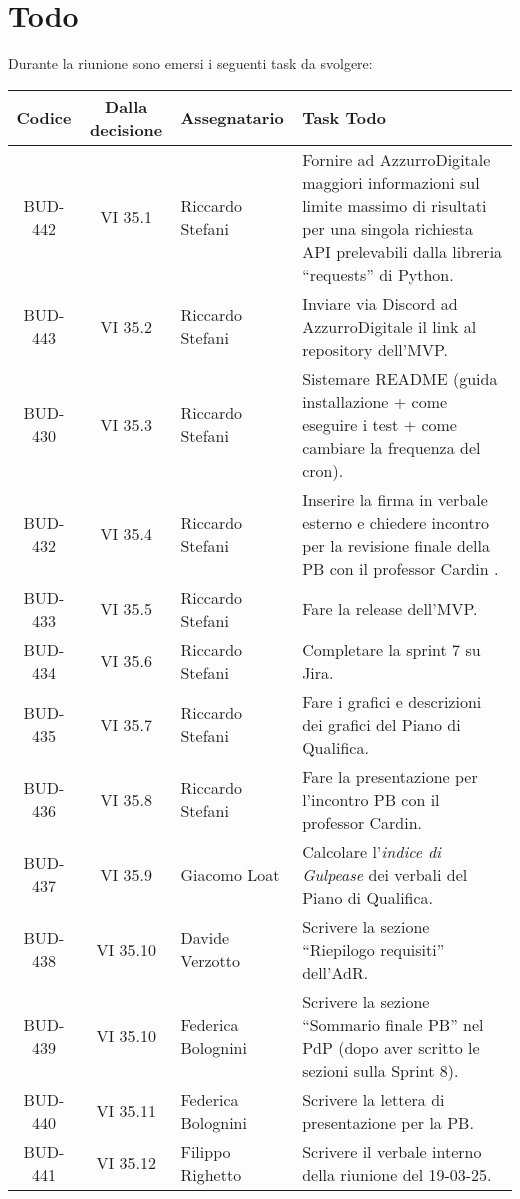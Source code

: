 
\section{Todo}

Durante la riunione sono emersi i seguenti task da svolgere:

\vspace{0.5cm}

\begin{table}[htbp]
\centering
{}
\begin{tabular}{|c|c|p{}|p{}|}
    \hline
    \rowcolor[gray]{0.75}
    \textbf{Codice} & \textbf{Dalla decisione} & \textbf{Assegnatario} & \textbf{Task Todo} \\
    \hline
    BUD-442 & VI 35.1 & Riccardo Stefani & Fornire ad AzzurroDigitale maggiori informazioni sul limite massimo di risultati per una singola richiesta API prelevabili dalla libreria “requests” di Python.\\
    \hline
    BUD-443 & VI 35.2 & Riccardo Stefani & Inviare via Discord ad AzzurroDigitale il link al repository dell’MVP.\\
    \hline
    BUD-430 & VI 35.3 & Riccardo Stefani & Sistemare README (guida installazione + come eseguire i test + come cambiare la frequenza del cron). \\
    \hline 
    BUD-432 & VI 35.4 & Riccardo Stefani & Inserire la firma in verbale esterno e chiedere incontro per la revisione finale della PB con il professor Cardin .\\
    \hline
    BUD-433 & VI 35.5 & Riccardo Stefani & Fare la release dell’MVP.\\
    \hline
    BUD-434 & VI 35.6 & Riccardo Stefani & Completare la sprint 7 su Jira. \\
    \hline
    BUD-435 & VI 35.7 & Riccardo Stefani & Fare i grafici e descrizioni dei grafici del Piano di Qualifica. \\
    \hline
    BUD-436 & VI 35.8 & Riccardo Stefani & Fare la presentazione per l’incontro PB con il professor Cardin. \\
    \hline
    BUD-437 & VI 35.9 & Giacomo Loat & Calcolare l’\emph{indice di Gulpease} dei verbali del Piano di Qualifica. \\
    \hline
    BUD-438 & VI 35.10 & Davide Verzotto & Scrivere la sezione “Riepilogo requisiti” dell’AdR.\\
    \hline
    BUD-439 & VI 35.10 & Federica Bolognini & Scrivere la sezione “Sommario finale PB” nel PdP (dopo aver scritto le sezioni sulla Sprint 8). \\
    \hline
    BUD-440 & VI 35.11 & Federica Bolognini & Scrivere la lettera di presentazione per la PB. \\
    \hline
    BUD-441 & VI 35.12 & Filippo Righetto & Scrivere il verbale interno della riunione del 19-03-25. \\
    \hline

\end{tabular}
\end{table}
